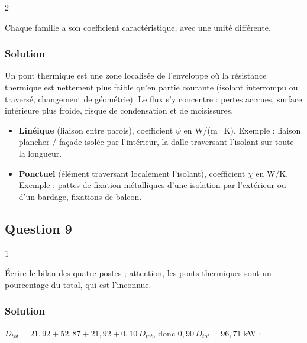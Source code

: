 \documentclass[11pt,a4paper]{article}
\providecommand{\tightlist}{\setlength{\itemsep}{0pt}\setlength{\parskip}{0pt}}
\begin{document}
\begin{indication}{2}

Chaque famille a son coefficient caractéristique, avec une unité différente.

\end{indication}

\hypertarget{solution-7}{%
\subsubsection{Solution}\label{solution-7}}

Un pont thermique est une zone localisée de l'enveloppe où la résistance thermique est nettement plus faible qu'en partie courante (isolant interrompu ou traversé, changement de géométrie). Le flux s'y concentre : pertes accrues, surface intérieure plus froide, risque de condensation et de moisissures.

\begin{itemize}
\tightlist
\item
  \textbf{Linéique} (liaison entre parois), coefficient \(\psi\) en W/(m·K). Exemple : liaison plancher / façade isolée par l'intérieur, la dalle traversant l'isolant sur toute la longueur.
\item
  \textbf{Ponctuel} (élément traversant localement l'isolant), coefficient \(\chi\) en W/K. Exemple : pattes de fixation métalliques d'une isolation par l'extérieur ou d'un bardage, fixations de balcon.
\end{itemize}

\hypertarget{question-9}{%
\subsection{Question 9}\label{question-9}}

\begin{indication}{1}

Écrire le bilan des quatre postes ; attention, les ponts thermiques sont un pourcentage du total, qui est l'inconnue.

\end{indication}

\hypertarget{solution-8}{%
\subsubsection{Solution}\label{solution-8}}

\(D_{tot}=21{,}92+52{,}87+21{,}92+0{,}10\,D_{tot}\), donc \(0{,}90\,D_{tot}=96{,}71\) kW :
\end{document}
